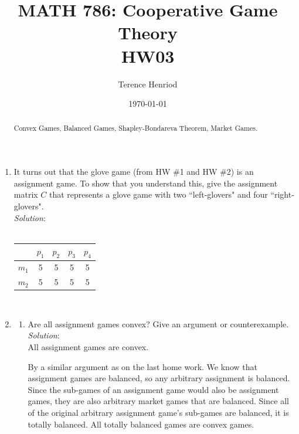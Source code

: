 \documentclass{article}
\title{MATH 786: Cooperative Game Theory \\ HW03}
\author{Terence Henriod}
\date{\today}
\begin{document}
\maketitle

\begin{abstract}
Convex Games, Balanced Games, Shapley-Bondareva Theorem, Market Games.
\end{abstract}


\newpage
\begin{enumerate}
\item It turns out that the glove game (from HW \#1 and HW \#2) is an assignment game. To show that you understand this, give the assignment matrix $C$ that represents a glove game with two ``left-glovers" and four ``right-glovers". \\

\textit{Solution}: \\
\\
\begin{center}
\begin{tabular}{ c | c | c | c | c |}
        & $p_{1}$ & $p_{2}$ & $p_{3}$ & $p_{4}$ \\
\hline
$m_{1}$ & 5       & 5       & 5       & 5 \\
\hline
$m_{2}$ & 5       & 5       & 5       & 5 \\
\hline 
\end{tabular}
\end{center} \hfill\\

%
\item
    \begin{enumerate}
    \item Are all assignment games convex? Give an argument or counterexample. \\

    \textit{Solution}: \\

    All assignment games are convex.

    By a similar argument as on the last home work. We know that assignment games are balanced, so any arbitrary assignment is balanced. Since the sub-games of an assignment game would also be
    assignment games, they are also arbitrary market games that are balanced. Since all of the original arbitrary assignment game's sub-games are balanced, it is totally balanced. All totally balanced games are convex games. \\


\end{enumerate}
\end{enumerate}
\end{document}
